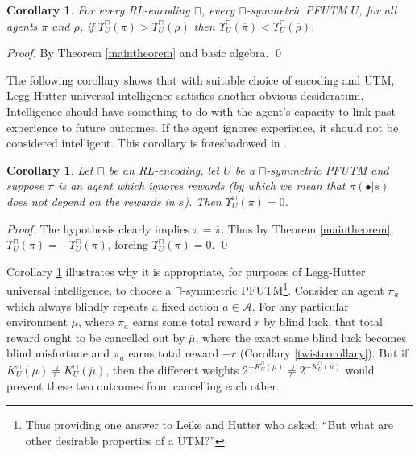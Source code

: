 \documentclass[runningheads]{llncs}
\newtheorem{mycorollary}[mytheorem]{Corollary}
\def\LH{\Upsilon}
\begin{document}
\begin{mycorollary}
\label{comparatorcorollary}
    For every RL-encoding $\sqcap$, every $\sqcap$-symmetric PFUTM $U$,
    for all agents $\pi$ and $\rho$, if $\LH^\sqcap_U(\pi)>\LH^\sqcap_U(\rho)$
    then $\LH^\sqcap_U(\overline\pi)<\LH^\sqcap_U(\overline\rho)$.
\end{mycorollary}

\begin{proof}
    By Theorem \ref{maintheorem} and basic algebra.
    \qed
\end{proof}

The following corollary shows that with suitable choice of encoding and UTM,
Legg-Hutter universal intelligence satisfies another obvious desideratum.
Intelligence should have something to do with the agent's capacity to link
past experience to future outcomes. If the agent ignores experience, it should
not be considered intelligent. This corollary is foreshadowed
in \cite{legg2013approximation}.

\begin{mycorollary}
\label{ignoringrewardscorollary}
    Let $\sqcap$ be an RL-encoding,
    let $U$ be a $\sqcap$-symmetric PFUTM and
    suppose $\pi$ is an agent which ignores rewards (by which we mean that
    $\pi(\bullet|s)$ does not depend on the rewards in $s$).
    Then $\LH^\sqcap_U(\pi)=0$.
\end{mycorollary}

\begin{proof}
    The hypothesis clearly implies $\pi=\overline\pi$. Thus by Theorem
    \ref{maintheorem}, $\LH^\sqcap_U(\pi)=-\LH^\sqcap_U(\pi)$,
    forcing $\LH^\sqcap_U(\pi)=0$.
    \qed
\end{proof}

Corollary \ref{ignoringrewardscorollary} illustrates why it is appropriate, for
purposes of Legg-Hutter universal intelligence, to choose a $\sqcap$-symmetric
PFUTM\footnote{Thus providing one answer to Leike and Hutter
\cite{leike2015bad} who asked: ``But what are other desirable properties of a UTM?''}.
Consider an agent $\pi_a$
which always blindly repeats a fixed action $a\in\mathcal A$.
For any particular environment $\mu$,
where $\pi_a$ earns some total reward $r$ by blind luck,
that total reward ought to be cancelled out by $\overline\mu$, where
the exact same blind luck becomes blind misfortune and $\pi_a$ earns total reward
$-r$ (Corollary \ref{twistcorollary}). But if $K^\sqcap_U(\mu)\not=K^\sqcap_U(\overline\mu)$,
then the different weights
$2^{-K^\sqcap_U(\mu)}\not=2^{-K^\sqcap_U(\overline\mu)}$ would prevent
these two outcomes from cancelling each other.
\end{document}

